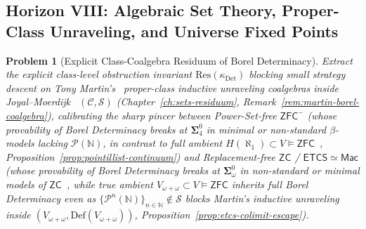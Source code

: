 \documentclass[10pt,twoside,openright]{book}
\theoremstyle{crmplain}
\newtheorem{problem}{Problem}[chapter]
\theoremstyle{crmdef}
\theoremstyle{crmremark}
\begin{document}
\subsection*{Horizon VIII: Algebraic Set Theory, Proper-Class Unraveling, and Universe Fixed Points}

\begin{problem}[Explicit Class-Coalgebra Residuum of Borel Determinacy]\label{prob:open-15}
Extract the explicit class-level obstruction invariant $\mathrm{Res}(\kappa_{\mathrm{Det}})$ blocking small strategy descent on Tony Martin's~\cite{Martin75} proper-class inductive unraveling coalgebras inside Joyal--Moerdijk~\cite{JoyalMoerdijk95} $(\mathcal{C}, \mathcal{S})$ (Chapter~\ref{ch:sets-residuum}, Remark~\ref{rem:martin-borel-coalgebra}), calibrating the sharp pincer between Power-Set-free $\mathsf{ZFC}^-$ (whose provability of Borel Determinacy breaks at $\boldsymbol{\Sigma}^0_4$ in minimal or non-standard $\beta$-models lacking $\mathcal{P}(\mathbb{N})$, in contrast to full ambient $H(\aleph_1) \subset V \models \mathsf{ZFC}$~\cite{Friedman71,MontalbanShore12,GitmanHamkinsJohnstone16}, Proposition~\ref{prop:pointillist-continuum}) and Replacement-free $\mathsf{ZC}$ / $\mathsf{ETCS} \simeq \mathsf{Mac}$ (whose provability of Borel Determinacy breaks at $\boldsymbol{\Sigma}^0_\omega$ in non-standard or minimal models of $\mathsf{ZC}$~\cite{Friedman71}, while true ambient $V_{\omega+\omega} \subset V \models \mathsf{ZFC}$ inherits full Borel Determinacy even as $\{\mathcal{P}^n(\mathbb{N})\}_{n \in \mathbb{N}} \notin \mathcal{S}$ blocks Martin's inductive unraveling inside $(V_{\omega+\omega}, \mathrm{Def}(V_{\omega+\omega}))$, Proposition~\ref{prop:etcs-colimit-escape}).
\end{problem}
\end{document}
